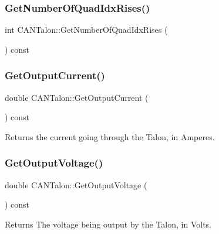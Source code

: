 \subsubsection{\texorpdfstring{Get\+Number\+Of\+Quad\+Idx\+Rises()}{GetNumberOfQuadIdxRises()}}
{\footnotesize\ttfamily int C\+A\+N\+Talon\+::\+Get\+Number\+Of\+Quad\+Idx\+Rises (\begin{DoxyParamCaption}{ }\end{DoxyParamCaption}) const}

\mbox{\label{class_c_a_n_talon_af24e57fe1d6a7ec64ab1a836d4d9c5ce}} 
\subsubsection{\texorpdfstring{Get\+Output\+Current()}{GetOutputCurrent()}}
{\footnotesize\ttfamily double C\+A\+N\+Talon\+::\+Get\+Output\+Current (\begin{DoxyParamCaption}{ }\end{DoxyParamCaption}) const\hspace{0.3cm}{\ttfamily [override]}}

Returns the current going through the Talon, in Amperes. \mbox{\label{class_c_a_n_talon_a47899fde5026631d18cdfa6fdce29b1d}} 
\subsubsection{\texorpdfstring{Get\+Output\+Voltage()}{GetOutputVoltage()}}
{\footnotesize\ttfamily double C\+A\+N\+Talon\+::\+Get\+Output\+Voltage (\begin{DoxyParamCaption}{ }\end{DoxyParamCaption}) const\hspace{0.3cm}{\ttfamily [override]}}

\begin{DoxyReturn}{Returns}
The voltage being output by the Talon, in Volts. 
\end{DoxyReturn}
\mbox{\label{class_c_a_n_talon_a701df7e254b4e6731bff57e7ae19d330}} 
